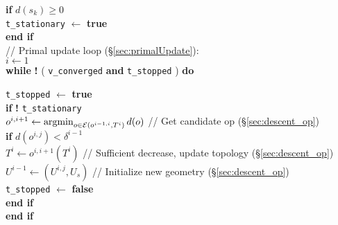 \begin{algorithm}[h!]
\hspace{10pt} \textbf{if} $d(s_k) \geq 0$ \\
\hspace{20pt} \texttt{t\_stationary} $\leftarrow$ \textbf{true}\\
\hspace{10pt} \textbf{end if} \\

\hspace{10pt} // Primal update loop (\S\ref{sec:primalUpdate}): \\
\hspace{10pt} $i \leftarrow 1$ \\
\hspace{10pt} \textbf{while}  \textbf{!}  ( \texttt{v\_converged} \hspace{2pt} \textbf{and} \hspace{2pt}  \texttt{t\_stopped} ) \hspace{2pt}   \textbf{do} 

\hspace{20pt} \texttt{t\_stopped} $\leftarrow$ \textbf{true} \\
\hspace{20pt} \textbf{if}  \textbf{!} \texttt{t\_stationary} \\
\hspace{30pt} $o^{i,i+1} \leftarrow \operatorname*{argmin}_{o \in \mathcal{E}(o^{i-1, i}, T^i)} d(o)$ \hspace{3pt}// Get candidate op (\S\ref{sec:descent_op})  \\
\hspace{30pt} \textbf{if} $d(o^{i,j}) < \delta^{i-1}$ \\
\hspace{40pt} $T^i \leftarrow o^{i, i+1}(T^i)$ \hspace{10pt} \hspace{-.4cm} // Sufficient decrease, update topology (\S\ref{sec:descent_op}) \\
\hspace{40pt} $U^{i-1} \leftarrow (U^{i,j}, U_s) $ \hspace{10pt} // Initialize new geometry (\S\ref{sec:descent_op}) \\
\hspace{40pt} \texttt{t\_stopped} $\leftarrow$ \textbf{false} \\
\hspace{30pt} \textbf{end if} \\
\hspace{20pt} \textbf{end if} \\


\end{algorithm}
